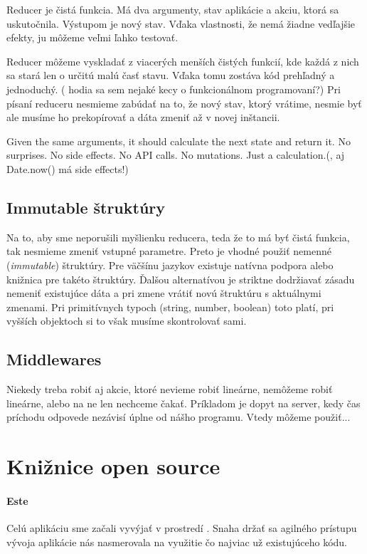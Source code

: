 Reducer je čistá funkcia. Má dva argumenty, stav aplikácie a akciu, ktorá sa uskutočnila. Výstupom je nový stav. Vďaka vlastnosti, že nemá žiadne vedľajšie efekty, ju môžeme veľmi ľahko testovať.

Reducer môžeme vyskladať z viacerých menších čistých funkcií, kde každá z nich sa stará len o určitú malú časť stavu. Vďaka tomu zostáva kód prehľadný a jednoduchý. 
(\TODO{} hodia sa sem nejaké kecy o funkcionálnom programovaní?)
Pri písaní reduceru nesmieme zabúdať na to, že nový stav, ktorý vrátime, nesmie byť  ale musíme ho prekopírovať a dáta zmeniť až v novej inštancii.

Given the same arguments, it should calculate the next state and return it. No surprises. No side effects. No API calls. No mutations. Just a calculation.(\TODO{}, aj Date.now() má side effects!)

\subsection{Immutable štruktúry}
Na to, aby sme neporušili myšlienku reducera, teda že to má byť čistá funkcia, tak nesmieme zmeniť vstupné parametre. Preto je vhodné použiť nemenné (\emph{immutable}) štruktúry. Pre väčšínu jazykov existuje natívna podpora alebo knižnica pre takéto štruktúry. Ďalšou alternatívou je striktne dodržiavať zásadu nemeniť existujúce dáta a pri zmene vrátiť novú štruktúru s aktuálnymi zmenami. Pri primitívnych typoch (string, number, boolean) toto platí, pri vyšších objektoch si to však musíme skontrolovať sami.

\subsection{Middlewares}
Niekedy treba robiť aj akcie, ktoré nevieme robiť lineárne, nemôžeme robiť lineárne, alebo na ne len nechceme čakať. Príkladom je dopyt na server, kedy čas príchodu odpovede nezávisí úplne od nášho programu. Vtedy môžeme použiť...%
\TODO



\section{Knižnice open source}%

\paragraph{Este}
Celú aplikáciu sme začali vyvýjať v prostredí \cite[este]{Este}. Snaha držať sa agilného prístupu vývoja aplikácie nás nasmerovala na využitie čo najviac už existujúceho kódu. %

